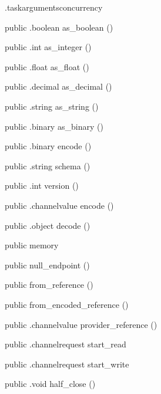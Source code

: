 \begin{CrexxClass}{.taskarguments}{concurrency}
\begin{Members}
    \Method
      {public}
      {.boolean}
      {as\_boolean}
      {()}

    \Method
      {public}
      {.int}
      {as\_integer}
      {()}

    \Method
      {public}
      {.float}
      {as\_float}
      {()}

    \Method
      {public}
      {.decimal}
      {as\_decimal}
      {()}

    \Method
      {public}
      {.string}
      {as\_string}
      {()}

    \Method
      {public}
      {.binary}
      {as\_binary}
      {()}

    \Method
      {public}
      {.binary}
      {encode}
      {()}

    \Method
      {public}
      {.string}
      {schema}
      {()}

    \Method
      {public}
      {.int}
      {version}
      {()}

    \Method
      {public}
      {.channelvalue}
      {encode}
      {()}

    \Method
      {public}
      {.object}
      {decode}
      {()}

    \Factory
      {public}
      {memory}
      {}

    \Factory
      {public}
      {null\_endpoint}
      {()}

    \Factory
      {public}
      {from\_reference}
      {()}

    \Factory
      {public}
      {from\_encoded\_reference}
      {()}

    \Method
      {public}
      {.channelvalue}
      {provider\_reference}
      {()}

    \Method
      {public}
      {.channelrequest}
      {start\_read}
      {}

    \Method
      {public}
      {.channelrequest}
      {start\_write}
      {}

    \Method
      {public}
      {.void}
      {half\_close}
      {()}


\end{Members}
\end{CrexxClass}
